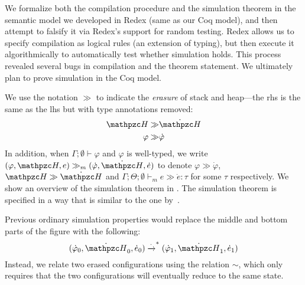 We formalize both the compilation procedure and the simulation
theorem in the semantic model we developed in Redex (same as our Coq model),
and then attempt to falsify it via Redex's support for random
testing. Redex allows us
  to specify compilation as logical rules (an extension
  of typing), but then execute it algorithmically to
  automatically test whether simulation holds. This process revealed
  several bugs in compilation and the theorem statement.
%
We ultimately plan to prove simulation in the Coq model.

We use the notation $\gg$ to
indicate the \emph{erasure} of stack and heap---the rhs is the same as
the lhs but with type annotations removed:
\begin{equation*}
  \begin{split}
    \heap  \gg & \dot \heap \\
    \varphi \gg & \dot \varphi
  \end{split}
\end{equation*}
In addition, when $\Gamma;\emptyset\vdash
\varphi$ and $\varphi$ is well-typed, we write $(\varphi,\heap,e) \gg_m (\dot \varphi, \dot \heap,
\dot e)$ to denote $\varphi \gg \dot \varphi$, $\heap \gg \dot \heap$
and $\Gamma;\Theta;\emptyset \vdash_m e \gg \dot e : \tau$ for some $\tau$ respectively. 
We show an overview of the simulation theorem in .
The simulation theorem is specified in a way that is similar to the one by~\citet{merigoux2021catala}.

Previous ordinary simulation properties would
replace the middle and bottom parts of the figure with the
following: \[(\dot \varphi_0, \dot \heap_0, \dot e_0) 
  \xrightarrow{\cdot}^* (\dot \varphi_1, \dot \heap_1, \dot e_1)\]
Instead, we relate two erased configurations using the relation $\sim$,
which only requires that the two configurations will eventually reduce
to the same state.

